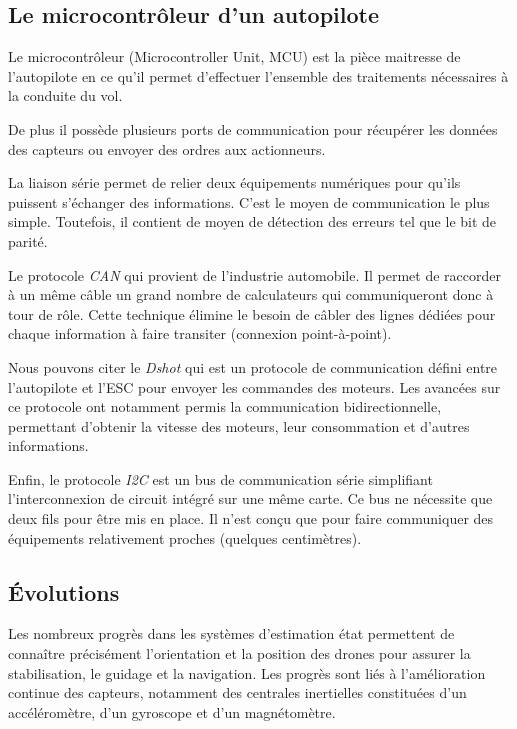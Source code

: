  \subsection{Le microcontrôleur d'un autopilote}
 \label{sec:micoctrl}
 Le microcontrôleur (Microcontroller Unit, MCU)  est la pièce maitresse de l'autopilote en ce qu'il permet d'effectuer l'ensemble des traitements nécessaires à la conduite du vol.

 De plus il possède plusieurs ports de communication pour récupérer les données des capteurs ou envoyer des ordres aux actionneurs.


 
{\color{red}
La liaison série permet de relier deux équipements numériques pour qu'ils puissent s'échanger des informations. C'est le moyen de communication le plus simple. Toutefois, il contient de moyen de détection des erreurs tel que le bit de parité.

 Le protocole \textit{CAN} qui provient de l'industrie automobile. Il permet de raccorder à un même câble un grand nombre de calculateurs qui communiqueront donc à tour de rôle. Cette technique élimine le besoin de câbler des lignes dédiées pour chaque information à faire transiter (connexion point-à-point).

 Nous pouvons citer le \textit{Dshot} qui est un protocole de communication défini entre l'autopilote et l'ESC pour envoyer les commandes des moteurs. Les avancées sur ce protocole ont notamment permis la communication bidirectionnelle, permettant d'obtenir la vitesse des moteurs, leur consommation et d'autres informations.

 Enfin, le protocole \textit{I2C} est un bus de communication série simplifiant l'interconnexion de circuit intégré sur une même carte. Ce bus ne nécessite que deux fils pour être mis en place. Il n'est conçu que pour faire communiquer des équipements relativement proches (quelques centimètres).
}
 \subsection{Évolutions}
 Les nombreux progrès dans les systèmes d'estimation état permettent de connaître précisément l'orientation et la position des drones pour assurer la stabilisation, le guidage et la navigation. Les progrès sont liés à l'amélioration continue des capteurs, notamment des centrales inertielles constituées d'un accéléromètre, d'un gyroscope et d'un magnétomètre.

